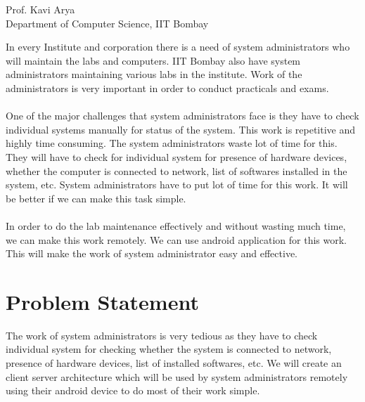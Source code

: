\documentclass[oneside,a4paper,12pt]{article}
\begin{document}
\bgroup
\def\arraystretch{0.7}
\vspace{35pt}


\begin{center}
{
Prof. Kavi Arya
\\Department of Computer Science, IIT Bombay
}
\end{center}
\newpage
{   \setlength{\parindent}{11mm} }
{ \setlength{\parindent}{0mm} }

In every Institute and corporation there is a need of system administrators who will maintain the labs and computers. IIT Bombay also have system administrators maintaining various labs in the institute. Work of the administrators is very important in order to conduct practicals and exams.
\\\\
One of the major challenges that system administrators face is they have to check individual systems manually for status of the system. This work is repetitive and highly time consuming. The system administrators waste lot of time for this. They will have to check for individual system for presence of hardware devices, whether the computer is connected to network, list of softwares installed in the system, etc. System administrators have to put lot of time for this work. It will be better if we can make this task simple. 
\\\\
In order to do the lab maintenance effectively and without wasting much time, we can make this work remotely. We can use android application for this work. This will make the work of system administrator easy and effective. 


\noindent
\vfill
\newpage
\tableofcontents
\newpage
\listoffigures
\setlength{\parindent}{11mm}
\newpage
\section{Problem Statement}

       The work of system administrators is very tedious as they have to check individual system for checking whether the system is connected to network, presence of hardware devices, list of installed softwares, etc. We will create an client server architecture which will be used by system administrators remotely using their android device to do most of their work simple.
    
\end{document}
